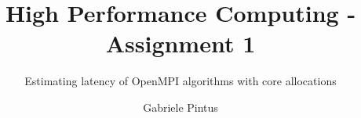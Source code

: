 \title{High Performance Computing - Assignment 1}
\subtitle{Estimating latency of OpenMPI algorithms with core allocations}

%
%


%
% 
\author{Gabriele Pintus}

